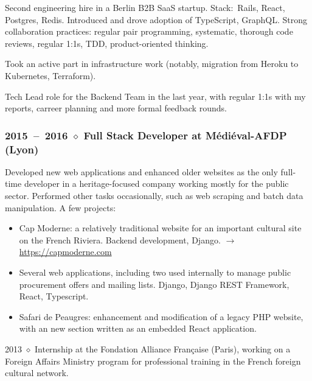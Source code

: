 \documentclass[10pt]{article}
\begin{document}
\begin{minipage}[t]{0.54\textwidth}
    \vspace{-0.8em}

    Second engineering hire in a Berlin B2B SaaS startup. Stack:~Rails, React,
    Postgres, Redis. Introduced and drove adoption of
    TypeScript, GraphQL. Strong collaboration practices: regular pair programming, systematic, thorough code reviews, regular 1:1s, TDD, product-oriented thinking.

    Took an active part in infrastructure work (notably, migration from Heroku
    to Kubernetes, Terraform).

    Tech Lead role for the Backend Team in the last year, with regular 1:1s with
    my reports, carreer planning and more formal feedback rounds.

    \vspace{-0.5em}

    \subsubsection*{2015~--~2016 $\diamond$ Full Stack Developer at Médiéval-AFDP (Lyon)}

    \vspace{-0.8em}

    Developed new web applications and enhanced older websites as the only
    full-time developer in a heritage-focused company working mostly for
    the public sector. Performed other tasks occasionally, such as web
    scraping and batch data manipulation. A few projects:
    \begin{itemize}
    \item
      Cap Moderne: a relatively traditional website for an important cultural site
      on the French Riviera. Backend development, Django. $\rightarrow$ \url{https://capmoderne.com}
    \item
      Several web applications, including two used internally to manage public
      procurement offers and mailing lists. Django, Django REST Framework,
      React, Typescript.
    \item
      Safari de Peaugres: enhancement and modification of a legacy PHP website,
      with an new section written as an embedded React application.
    \end{itemize}

  2013 $\diamond$ Internship at the Fondation Alliance Française (Paris), working on a
  Foreign Affairs Ministry program for professional training in the French
  foreign cultural network.
\end{minipage}
\end{document}
